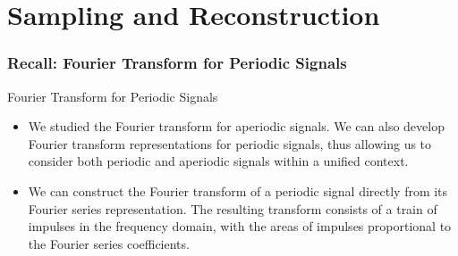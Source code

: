 \part{Sampling and Reconstruction}
\section{Recall: Fourier Transform for Periodic Signals}
\begin{frame}{Fourier Transform for Periodic Signals}
    \begin{itemize}
      \item We studied the Fourier transform for aperiodic signals. We can also develop Fourier transform representations for periodic signals, thus allowing us to consider both periodic and aperiodic signals within a unified context.
      \item We can construct the Fourier transform of a periodic signal directly from its Fourier series representation. The resulting transform consists of a train of impulses in the frequency domain, with the areas of impulses proportional to the Fourier series coefficients.
    \end{itemize}
\end{frame}

